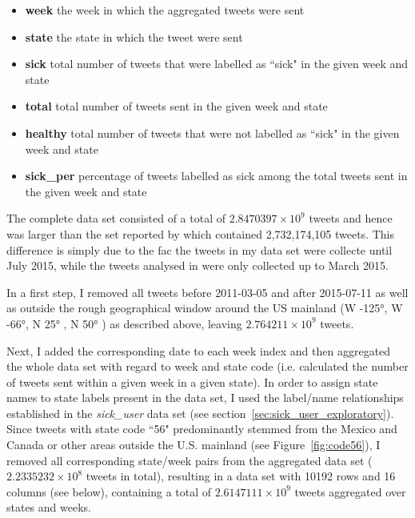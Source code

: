 \documentclass[11pt, a4paper,twoside]{report}\usepackage[]{graphicx}\usepackage[]{color}
\begin{document}
\begin{itemize}
  \item \textbf{week} the week in which the aggregated tweets were sent
  \item \textbf{state} the state in which the tweet were sent
  \item \textbf{sick} total number of tweets that were labelled as ``sick" in the given week and state
  \item \textbf{total} total number of tweets sent in the given week and state
  \item \textbf{healthy} total number of tweets that were not labelled as ``sick" in the given week and state
  \item \textbf{sick\_per} percentage of tweets labelled as sick among the total tweets sent in the given week and state
\end{itemize}


The complete data set consisted of a total of \ensuremath{2.8470397\times 10^{9}} tweets and hence was larger than the set reported by \citep{bodnar_data_2015} which contained 2,732,174,105 tweets. This difference is simply due to the fac the tweets in my data set were collecte until July 2015, while the tweets analysed in \citep{bodnar_data_2015} were only collected up to March 2015.\newline

In a first step, I removed all tweets before 2011-03-05 and after 2015-07-11 as well as outside the rough geographical window around the US mainland (W -125°, W -66°, N 25° , N 50° ) as described above, leaving \ensuremath{2.764211\times 10^{9}} tweets. \newline

Next, I added the corresponding date to each week index and then aggregated the whole data set with regard to week and state code (i.e. calculated the number of tweets sent within a given week in a given state). In order to assign state names to state labels present in the data set, I used the label/name relationships established in the \textit{sick\_user} data set (see section~\ref{sec:sick_user_exploratory}). Since tweets with state code ``56" predominantly stemmed from the Mexico and Canada or other areas outside the U.S. mainland (see Figure~\ref{fig:code56}), I removed all corresponding state/week pairs from the aggregated data set (\ensuremath{2.2335232\times 10^{8}} tweets in total), resulting in a data set with 10192 rows and 16 columns (see below), containing a total of \ensuremath{2.6147111\times 10^{9}} tweets aggregated over states and weeks.
\end{document}

